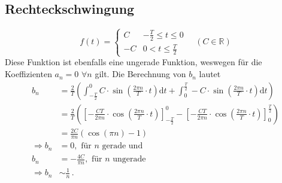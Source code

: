 \subsection{Rechteckschwingung}
\begin{equation*}
    f(t) = \begin{cases}
        C & -\frac{T}{2} \leq t \leq 0\\
        -C & 0 < t \leq \frac{T}{2}
    \end{cases}
    \quad (C \in \mathbb{R})
\end{equation*}
Diese Funktion ist ebenfalls eine ungerade Funktion, weswegen für die Koeffizienten $a_n=0\,\,\forall n$ gilt. Die Berechnung von $b_n$ lautet
\begin{align*}
    b_n &= \frac{2}{T}\left( \int _{-\frac{T}{2}}^{0} C \cdot \sin \left(\frac{2\pi n}{T}\cdot t\right)\text{d}t + \int_{0}^{\frac{T}{2}}-C \cdot \sin \left(\frac{2\pi  n}{T}\cdot t\right)\text{d}t\right)\\
    &= \frac{2}{T}\left( \left[-\frac{CT}{2 \pi n}\cdot \cos \left(\frac{2\pi n}{T}\cdot t\right)\right]_{-\frac{T}{2}}^{0} - \left[-\frac{CT}{2 \pi n}\cdot \cos \left(\frac{2\pi n}{T}\cdot t\right)\right]_{0}^{\frac{T}{2}}\right)\\
    &= \frac{2C}{\pi n} \left(\cos\left(\pi n\right) - 1 \right)\\
    \Rightarrow b_n &= 0,\text{ für } n\text{ gerade und}\\
     b_n &= -\frac{4C}{\pi n},\text{ für } n\text{ ungerade}\\
    \Rightarrow b_n &\sim \frac{1}{n}\,.
\end{align*}

